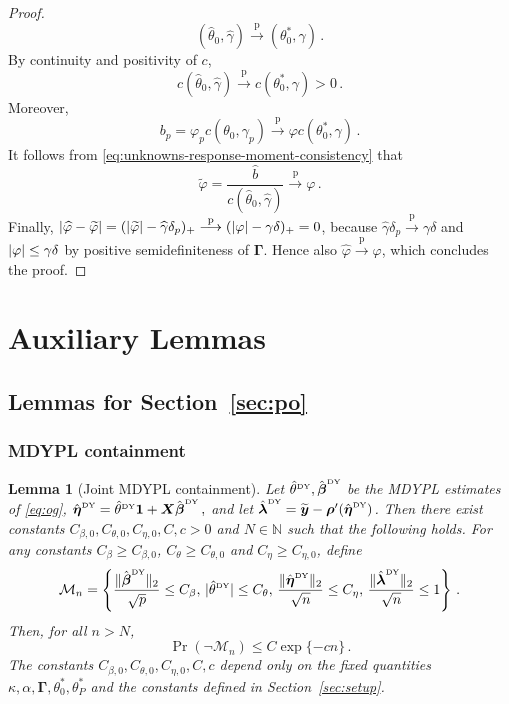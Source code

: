 \documentclass{article}
\makeatletter
\newtheorem{lemma}{Lemma}
\theoremstyle{definition}
\newcommand{\vnorm}[1]{%
	\ensuremath{%
		\if@display
		\left\| #1 \right\|
		\else
		\| #1 \|
		\fi
	}%
}
\newcommand{\abs}[1]{%
	\ensuremath{%
		\if@display
		\left| #1 \right|
		\else
		\lvert #1 \rvert
		\fi
	}%
}
\newcommand*{\bb}{\boldsymbol}
\newcommand{\betady}{\ensuremath{\hat{\bbeta}^{\textrm{\tiny DY}}}}
\newcommand{\etady}{\ensuremath{\hat{\bb{\eta}}^{\textrm{\tiny DY}}}}
\newcommand{\thetady}{\ensuremath{\hat{\theta}^{\textrm{\tiny DY}}}}
\def\bX{\bb{X}}
\def\bYtil{\widetilde{\bb{y}}}
\def\bbeta{\bb{\beta}}
\def\blambda{\bb{\lambda}}
\makeatother
\begin{document}
\begin{bibunit}
\begin{proof}
\begin{equation}
\label{eq:unknowns-response-channel-consistency}
    (
        \widehat\theta_0,
        \widehat\gamma
    )
    \overset{\mathrm p}{\longrightarrow}
    (
        \theta_0^*,
        \gamma
    )\,.
\end{equation}
By continuity and positivity of $c$,
$$
    c(\widehat\theta_0,\widehat\gamma)
    \overset{\mathrm p}{\longrightarrow}
    c(\theta_0^*,\gamma)
    >0\,.
$$
Moreover,
$$
    b_p
    =
    \varphi_pc(\theta_0,\gamma_p)
    \overset{\mathrm p}{\longrightarrow}
    \varphi c(\theta_0^*,\gamma)\,.
$$
It follows from
\eqref{eq:unknowns-response-moment-consistency} that
$$
    \widetilde\varphi
    =
    \frac{
        \widehat b
    }{
        c(\widehat\theta_0,\widehat\gamma)
    }
    \overset{\mathrm p}{\longrightarrow}
    \varphi\,.
$$
Finally,
$
    \abs{\widehat\varphi-\widetilde\varphi}
    =
    (\abs{\widetilde\varphi}-\widehat\gamma\delta_p)_+
    \overset{\mathrm p}{\longrightarrow}
    (\abs{\varphi}-\gamma\delta)_+
    =
    0
$,
because $\widehat\gamma\delta_p\overset{\mathrm p}{\longrightarrow}\gamma\delta$ and
$\abs{\varphi}\leq\gamma\delta$ by positive semidefiniteness of
$\bb\Gamma$. Hence also $\widehat\varphi\overset{\mathrm p}{\longrightarrow}\varphi$, which concludes the proof. 
\end{proof}


\section{Auxiliary Lemmas}
\label{sec:aux-lemmas}

\subsection{Lemmas for Section~\ref{sec:po}}

\subsubsection{MDYPL containment}

\begin{lemma}[Joint MDYPL containment]
	\label{lemma:containment}
	Let $\thetady, \betady$ be the MDYPL estimates of \eqref{eq:og}, $\etady = \thetady \bb 1 + \bX\betady \,,$
	and let $\hat{\blambda}^{\textrm{\tiny DY}}=\bYtil-\bb\rho'(\etady)$.
	Then there exist constants
	$C_{\beta,0},C_{\theta,0},C_{\eta,0},C,c>0$ and $N\in\mathbb N$
	such that the following holds. For any constants
	$C_\beta\geq C_{\beta,0}$, $C_\theta\geq C_{\theta,0}$ and
	$C_\eta\geq C_{\eta,0}$, define
	$$
		\mathcal{M}_n
		=
		\left\{
			\frac{\vnorm{\betady}_2}{\sqrt p} \leq C_\beta,\,
			\abs{\thetady} \leq C_\theta,\,
			\frac{\vnorm{\etady}_2}{\sqrt n} \leq C_\eta,\,
			\frac{\vnorm{\hat{\blambda}^{\textrm{\tiny DY}}}_2}{\sqrt n} \leq 1
		\right\} \,.
	$$
	Then, for all $n>N$,
	$$
		\Pr\left(\lnot\mathcal M_n\right)
		\leq
		C\exp\{-cn\} \,.
	$$
	The constants $C_{\beta,0},C_{\theta,0},C_{\eta,0},C,c$ depend only on
	the fixed quantities $\kappa,\alpha,\bb\Gamma,\theta_0^*,\theta_P^*$ and
	the constants defined in Section~\ref{sec:setup}.
\end{lemma}


\end{bibunit}
\end{document}
